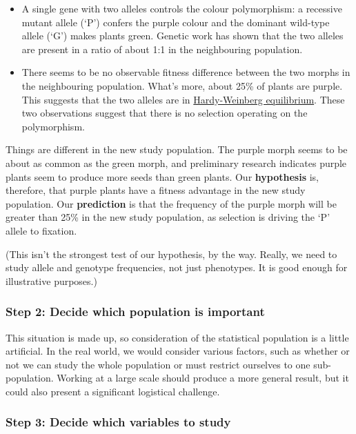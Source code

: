 \documentclass[
]{book}
\begin{document}
\begin{itemize}
\item
  A single gene with two alleles controls the colour polymorphism: a recessive mutant allele (`P') confers the purple colour and the dominant wild-type allele (`G') makes plants green. Genetic work has shown that the two alleles are present in a ratio of about 1:1 in the neighbouring population.
\item
  There seems to be no observable fitness difference between the two morphs in the neighbouring population. What's more, about 25\% of plants are purple. This suggests that the two alleles are in \href{https://en.wikipedia.org/wiki/Hardy–Weinberg_principle}{Hardy-Weinberg equilibrium}. These two observations suggest that there is no selection operating on the polymorphism.
\end{itemize}

Things are different in the new study population. The purple morph seems to be about as common as the green morph, and preliminary research indicates purple plants seem to produce more seeds than green plants. Our \textbf{hypothesis} is, therefore, that purple plants have a fitness advantage in the new study population. Our \textbf{prediction} is that the frequency of the purple morph will be greater than 25\% in the new study population, as selection is driving the `P' allele to fixation.

(This isn't the strongest test of our hypothesis, by the way. Really, we need to study allele and genotype frequencies, not just phenotypes. It is good enough for illustrative purposes.)

\hypertarget{step-2-decide-which-population-is-important}{%
\subsubsection*{Step 2: Decide which population is important}\label{step-2-decide-which-population-is-important}}

This situation is made up, so consideration of the statistical population is a little artificial. In the real world, we would consider various factors, such as whether or not we can study the whole population or must restrict ourselves to one sub-population. Working at a large scale should produce a more general result, but it could also present a significant logistical challenge.

\hypertarget{step-3-decide-which-variables-to-study-1}{%
\subsubsection*{Step 3: Decide which variables to study}\label{step-3-decide-which-variables-to-study-1}}
\end{document}
